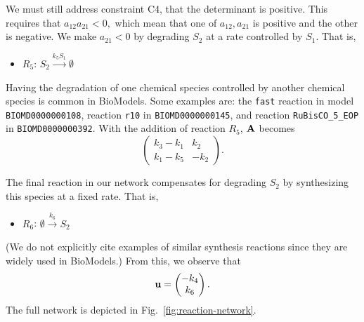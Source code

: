 \documentclass{bmcart}
\newcommand{\fig}[1]{Fig.~\ref{#1}}
\begin{document}
We must still address constraint C4, that the determinant is positive. This requires that $a_{12} a_{21} < 0,$ which mean that one of $a_{12}, a_{21}$ is positive and the other is negative. We make $a_{21} < 0$ by degrading $S_2$ at a rate controlled by $S_1$.
That is,
\begin{itemize}
    \item $R_5$: $S_2 \xrightarrow{k_5 S_1}\emptyset$
\end{itemize}
Having the degradation of one chemical species controlled by another chemical species is common in BioModels. Some examples are: the {\tt fast} reaction in model {\tt BIOMD0000000108}, reaction {\tt r10} in {\tt BIOMD0000000145},
and reaction {\tt RuBisCO\_5\_EOP} in {\tt BIOMD0000000392}. With the addition of reaction $R_5$,
${\bf A}$ becomes
$$\left( \begin{matrix}
     k_3 - k_1 & k_2  \\
     k_1 - k_5 & -k_2
\end{matrix} \right).$$

The final reaction in our network compensates for degrading $S_2$ by synthesizing this species at a fixed rate. That is,
\begin{itemize}
    \item $R_6$: $\emptyset \xrightarrow{k_6} S_2$
\end{itemize}
(We do not explicitly cite examples of similar synthesis reactions since they are widely used in BioModels.)
From this, we observe that 
\begin{equation}
   {\bf u} = \left( \begin{matrix}
       -k_4 \\
       k_6
   \end{matrix} \right). \label{eq:u}
\end{equation}
 The full network is depicted in \fig{fig:reaction-network}.
\end{document}

